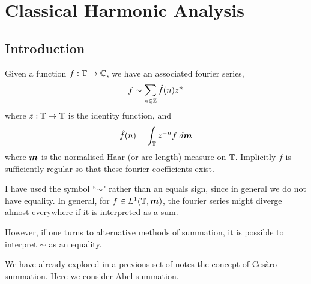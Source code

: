 
\chapter{Classical Harmonic Analysis} %

\label{AppendixA} %



\section{Introduction}
Given a function $f:\mathbb{T}\rightarrow\mathbb{C}$, we have an associated fourier series, 
\begin{equation}
\label{series}
    f \sim \sum_{n \in \Itgr} \hat{f}(n)z^n
\end{equation}
where $z:\mathbb{T}\rightarrow\mathbb{T}$ is the identity function, and
\begin{equation}
\label{coefficient}
    \hat{f}(n) = \int_\Circ z^{-n} f\;d\ha
\end{equation}
where $\boldsymbol{m}$ is the normalised Haar (or arc length) measure on $\mathbb{T}$. Implicitly
$f$ is sufficiently regular so that these fourier coefficients exist.

I have used the symbol ``$\sim$" rather than an equals sign, since in general
we do not have equality. In general, for $f \in L^1(\mathbb{T},\boldsymbol{m})$, the fourier
series might diverge almost everywhere if it is interpreted as a sum.

However, if one turns to alternative methods of summation, it is possible to 
interpret $\sim$ as an equality. 

We have already explored in a previous set of notes the concept
of Ces\`aro summation. Here we consider Abel summation.

